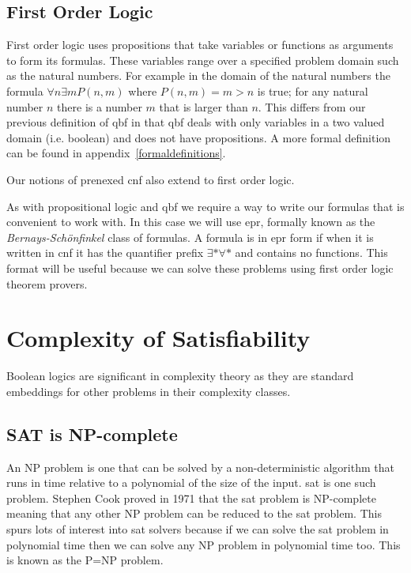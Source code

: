 \subsection{First Order Logic}
First order logic uses propositions that take variables or functions as arguments to form its formulas. These variables range over a specified problem domain such as the natural numbers. For example in the domain of the natural numbers the formula $\forall n \exists m P(n, m)$ where $P(n, m) = m > n$ is true; for any natural number $n$ there is a number $m$ that is larger than $n$. This differs from our previous definition of \gls{qbf} in that \gls{qbf} deals with only variables in a two valued domain (i.e. boolean) and does not have propositions. A more formal definition can be found in appendix~\ref{formaldefinitions}.

Our notions of prenexed \gls{cnf} also extend to first order logic.

As with propositional logic and \gls{qbf} we require a way to write our formulas that is convenient to work with. In this case we will use \gls{epr}, formally known as the \textit{Bernays-Sch{\"o}nfinkel} class of formulas. A formula is in \gls{epr} form if when it is written in \gls{cnf} it has the quantifier prefix $\exists * \forall *$ and contains no functions. This format will be useful because we can solve these problems using first order logic theorem provers.

\section{Complexity of Satisfiability}
Boolean logics are significant in complexity theory as they are standard embeddings for other problems in their complexity classes.

\subsection{SAT is NP-complete}
An NP problem is one that can be solved by a non-deterministic algorithm that runs in time relative to a polynomial of the size of the input. \Gls{sat} is one such problem. Stephen Cook proved in 1971 that the \gls{sat} problem is NP-complete~\cite{cook1971complexity} meaning that any other NP problem can be reduced to the \gls{sat} problem. This spurs lots of interest into \gls{sat} solvers because if we can solve the \gls{sat} problem in polynomial time then we can solve any NP problem in polynomial time too. This is known as the P=NP problem.

